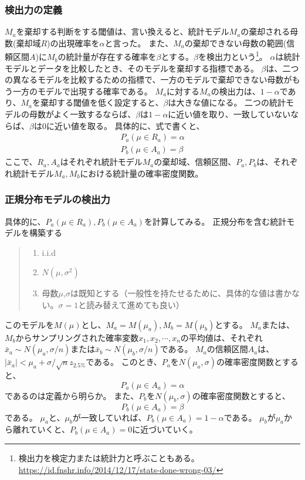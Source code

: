\documentclass[a4paper,11pt,dvipdfmx]{jsarticle}
\begin{document}
\subsubsection{検出力の定義}
$M_a$を棄却する判断をする閾値は、言い換えると、統計モデル$M_a$の棄却される母数(棄却域$R$)の出現確率を$\alpha$と言った。
また、$M_a$の棄却できない母数の範囲(信頼区間$A$)に$M_b$の統計量が存在する確率を$\beta$とする。$\beta$を検出力という\footnote{検出力を検定力または統計力と呼ぶこともある。\url{https://id.fnshr.info/2014/12/17/stats-done-wrong-03/}}。
$\alpha$は統計モデルとデータを比較したとき、そのモデルを棄却する指標である。
$\beta$は、二つの異なるモデルを比較するための指標で、一方のモデルで棄却できない母数がもう一方のモデルで出現する確率である。
$M_a$に対する$M_a$の検出力は、$1-\alpha$であり、$M_a$を棄却する閾値を低く設定すると、$\beta$は大きな値になる。
二つの統計モデルの母数がよく一致するならば、$\beta$は$1-\alpha$に近い値を取り、一致していないならば、$\beta$は0に近い値を取る。
具体的に、式で書くと、
\begin{eqnarray*}
    P_a(\mu \in R_a) = \alpha\\
    P_b(\mu \in A_a) = \beta
\end{eqnarray*}
ここで、$R_a,A_a$はそれぞれ統計モデル$M_a$の棄却域、信頼区間、$P_a,P_b$は、それぞれ統計モデル$M_a,M_b$における統計量の確率密度関数。

\subsubsection{正規分布モデルの検出力}
具体的に、$P_a(\mu \in R_a),P_b(\mu\in A_a)$を計算してみる。
正規分布を含む統計モデルを構築する
\begin{quote}
    \begin{enumerate}[(1)]
\item i.i.d
\item $N(\mu,\sigma^2)$
\item 母数$\mu$,$\sigma$は既知とする（一般性を持たせるために、具体的な値は書かない。$\sigma=1$と読み替えて進めても良い）
\end{enumerate}
\end{quote}
このモデルを$M(\mu)$とし、$M_a=M(\mu_a),M_b=M(\mu_b)$とする。
$M_a$または、$M_b$からサンプリングされた確率変数$x_1,x_2,\cdots,x_n$の平均値は、それぞれ$\bar{x}_a\sim N(\mu_a,\sigma/n)$または$\bar{x}_b\sim N(\mu_b,\sigma/n)$である。
$M_a$の信頼区間$A_a$は、$|\bar{x}_a|<\mu_a+\sigma / \sqrt{n}z_{2.5\%}$である。
このとき、$P_a$を$N(\mu_a,\sigma)$の確率密度関数とすると、
\begin{equation*}
    P_a(\mu \in A_a) = \alpha
\end{equation*}
であるのは定義から明らか。
また、$P_b$を$N(\mu_b,\sigma)$の確率密度関数とすると、
\begin{equation*}
    P_b(\mu \in A_a ) = \beta
\end{equation*}
である。
$\mu_a$と、$\mu_b$が一致していれば、$P_b(\mu \in A_a ) = 1-\alpha$である。
$\mu_b$が$\mu_a$から離れていくと、$P_b(\mu \in A_a)=0$に近づいていく。
\end{document}
